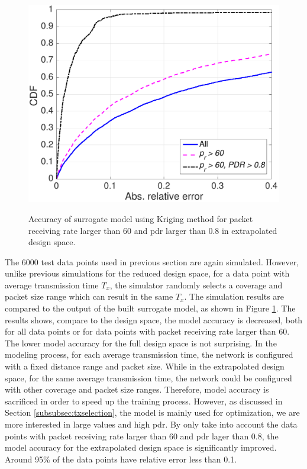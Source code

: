  
 \begin{figure}[t]
    \centering
{\includegraphics[width=0.8\columnwidth]{figures/Extend_constraint_09}}
  \caption{Accuracy of surrogate model using Kriging method for packet receiving rate larger than 60 and \gls{pdr} larger than 0.8 in extrapolated design space. \label{fig:cdf_constraint_extended}}
\end{figure}
 
The 6000 test data points used in previous section are again simulated. However, unlike previous simulations for the reduced design space, for a data point with average transmission time $T_x$, the simulator randomly selects a  coverage and packet size range which can result in the same $T_x$. The simulation results are compared to the output of the built surrogate model, as shown in Figure \ref{fig:cdf_constraint_extended}. The results shows, compare to the design space, the model accuracy is decreased,  both for all data points or for data points with packet receiving rate larger than 60. The lower model accuracy for the full design space is not surprising. In the modeling process, for each average transmission time, the network is configured with a fixed distance range and packet size. While in the extrapolated design space, for the same average transmission time, the network could be configured with other coverage  and packet size ranges. Therefore, model accuracy is sacrificed in order to speed up the training process. However, as discussed in Section \ref{subsubsec:txselection}, the model is mainly used for optimization, we are more interested in large values and high \gls{pdr}. By only take into account the data points with packet receiving rate larger than 60 and \gls{pdr} lager than 0.8, the model accuracy for the extrapolated design space is significantly improved. Around 95\% of the data points have relative error less than 0.1. 


